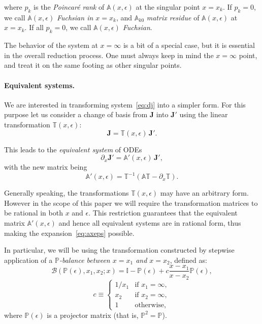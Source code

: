 \documentclass{elsarticle}
\newcommand{\eps}{\epsilon}
\newcommand{\M}[1]{\mathbb{#1}} %
\newcommand{\V}[1]{\mathbf{#1}} %
\begin{document}
where $p_k$ is the \textit{Poincar\'e rank} of $\M A(x,\eps)$ at the singular point $x=x_k$.
If $p_k=0$, we call $\M A(x,\eps)$ \textit{Fuchsian in $x=x_k$}, and $\M A_{k0}$ \textit{matrix residue} of $\M A(x,\eps)$ at $x=x_k$.
If all $p_k=0$, we call $\M A(x,\eps)$ \textit{Fuchsian}.

The behavior of the system at $x=\infty$ is a bit of a special case, but it is essential in the overall reduction process.
One must always keep in mind the $x=\infty$ point, and treat it on the same footing as other singular points.

\paragraph{Equivalent systems.}
We are interested in transforming system~\eqref{eq:dj} into a simpler form.
For this purpose let us consider a change of basis from $\V J$ into $\V J'$ using the linear transformation $\M T(x,\eps)$:
\begin{equation}
  \V J = \M T(x,\eps)\, \V J'.
\end{equation}

This leads to the {\em equivalent system} of ODEs
\begin{equation}
  \partial_x \V J' = \M A'(x,\eps)\,\V J',
\end{equation}
with the new matrix being
\begin{equation}
\label{eq:ta}
  \M A'(x,\eps) = \M T^{-1} \left( \M A \M T - \partial_x \M T \right).
\end{equation}

Generally speaking, the transformations $\M T(x,\eps)$ may have an arbitrary form.
However in the scope of this paper we will require the transformation matrices to be rational in both $x$ and $\eps$.
This restriction guarantees that the equivalent matrix $\M A'(x,\eps)$ and hence all equivalent systems are in rational form, thus making the expansion~\eqref{eq:axeps} possible.

In particular, we will be using the transformation constructed by stepwise application of a \textit{$\M P$-balance between $x=x_1$ and $x=x_2$}, defined as:
\begin{equation}
\label{eq:bal}
    \mathcal{B}(\M P(\eps), x_1, x_2; x) = \M I - \M P(\eps) + c \frac{x-x_1}{x-x_2} \M P(\eps),
\end{equation}
\begin{equation*}
    c \equiv
    \begin{cases}
        1/x_1 & \text{if $x_1=\infty$}, \\
        x_2 & \text{if $x_2=\infty$}, \\
        1 & \text{otherwise},
    \end{cases}
\end{equation*}
where $\M P(\eps)$ is a projector matrix (that is, $\M P^2=\M P$).
\end{document}

